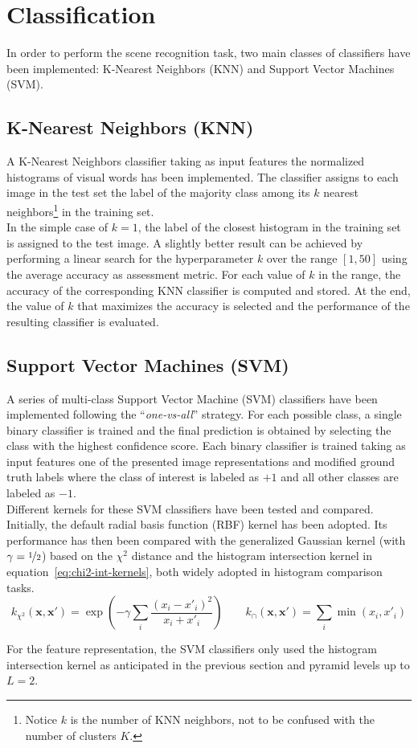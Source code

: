 \documentclass[../main.tex]{subfiles}
\begin{document}
\section{Classification}\label{sec:classification}

In order to perform the scene recognition task, two main classes of classifiers have been implemented: K-Nearest Neighbors (KNN) and Support Vector Machines (SVM). 

\subsection{K-Nearest Neighbors (KNN)}\label{subsec:knn}

A K-Nearest Neighbors classifier taking as input features the normalized
histograms of visual words has been implemented. The classifier assigns to each
image in the test set the label of the majority class among its $k$ nearest
neighbors\footnote{Notice $k$ is the number of KNN neighbors, not to be confused with the number of clusters $K$.} in the training set.\\
In the simple case of $k=1$, the label of the closest histogram in the training set is assigned to the test image. 
A slightly better result can be achieved by performing a linear search for the
hyperparameter $k$ over the range $[1, 50]$ using the average accuracy as assessment metric. For each value of $k$ in the range, the accuracy of the corresponding KNN classifier is computed and stored. At the end, the value of $k$ that maximizes the accuracy is selected and the performance of the resulting classifier is evaluated. 

\subsection{Support Vector Machines (SVM)}\label{subsec:svm}

A series of multi-class Support Vector Machine (SVM) classifiers have been implemented
following the ``\textit{one-vs-all}'' strategy. For each possible class, a
single binary classifier is trained and the final prediction is obtained by
selecting the class with the highest confidence score. Each binary classifier is
trained taking as input features one of the presented image representations and
modified ground truth labels where the class of interest is labeled as $+1$ and
all other classes are labeled as $-1$.\\
Different kernels for these SVM classifiers have been tested and compared.
Initially, the default radial basis function (RBF) kernel has been adopted. Its
performance has then been compared with the generalized Gaussian kernel (with
$\gamma = \nicefrac{1}{2}$) based on
the $\chi^2$ distance and the histogram
intersection kernel in equation~\ref{eq:chi2-int-kernels}, both widely
adopted in histogram comparison tasks.
\begin{equation}\label{eq:chi2-int-kernels}
	k_{\chi^2}(\mathbf{x}, \mathbf{x}') = \exp\left(-\gamma \sum_i \frac{({x}_i
	- {x}'_i)^2}{{x}_i + {x}'_i}\right) 
	\quad \quad
	k_{\cap}(\mathbf{x}, \mathbf{x}') = \sum_i \min({x}_i, {x}'_i)
\end{equation}

For the  feature representation, the SVM classifiers only used
the histogram intersection kernel as anticipated in the previous section and
pyramid levels up to $L=2$.
\end{document}
